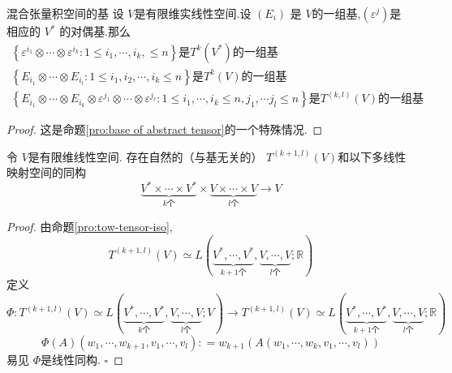 \documentclass[../../几何与拓扑.tex]{subfiles}
\begin{document}
\begin{definition}{混合张量积空间的基}
    设 $ V $是有限维实线性空间.设 $ \left( E_{i} \right)  $  是 $ V $的一组基,$ \left( \varepsilon ^{j} \right)  $是 相应的 $ V^{*} $   的对偶基.那么 $$
\begin{aligned}
    \left\{ \varepsilon^{i_1}\otimes \cdots \otimes \varepsilon^{i_{k}}: 1 \le i_1,\cdots ,i_{k},\le n \right\}\text{是} T^{k}\left( V^{*} \right)\text{的一组基} \\ 
     \left\{ E_{i_1}\otimes \cdots \otimes E_{i_{l}} : 1 \le  i_1,i_2,\cdots,i_k\le n\right\}\text{是} T^{k}\left( V \right)\text{的一组基}\\ 
      \left\{ E_{i_1}\otimes \cdots \otimes E_{i_{k}}\otimes \varepsilon^{j_1}\otimes \cdots \otimes  \varepsilon^{j_{\ell}} : 1\le i_1,\cdots ,i_{k} \le n,j_1,\cdots j_{l}\le n   \right\} \text{是} T^{\left( k,l \right) }\left( V \right) \text{的一组基}
\end{aligned} 
    $$
\end{definition}

\begin{proof}
    这是命题\ref{pro:base of abstract tensor}的一个特殊情况.
\end{proof}

\begin{proposition}
    令 \(  V  \)是有限维线性空间. 存在自然的（与基无关的） \(  T^{\left( k+ 1,l \right) }\left( V \right)   \)和以下多线性映射空间的同构 \[
    \underbrace{V^{*}\times \cdots \times V^{*}}_{k \text{个}} \times  \underbrace{V\times \cdots \times V} _{ l \text{个}} \to V
    \] 
\end{proposition}

\begin{proof}
    由命题\ref{pro:tow-tensor-iso}, \[
    T^{\left( k+ 1 ,l\right) }\left( V \right)\simeq L\left( \underbrace{V^{*}, \cdots , V^{*}}_{k+ 1\text{个}}, \underbrace{V, \cdots , V}_{l \text{个}};\mathbb{R} \right)  
    \]定义 \(  \Phi : T^{\left( k+ 1 ,l\right) }\left( V \right)\simeq L\left( \underbrace{V^{*}, \cdots , V^{*}}_{k\text{个}}, \underbrace{V, \cdots , V}_{l \text{个}};V \right) \to  T^{\left( k+ 1 ,l\right) }\left( V \right)\simeq L\left( \underbrace{V^{*}, \cdots , V^{*}}_{k+ 1\text{个}}, \underbrace{V, \cdots , V}_{l \text{个}};\mathbb{R} \right)    \)  \[
    \Phi \left( A \right)\left( w_1,\cdots ,w_{k+ 1},v_1,\cdots ,v_{l} \right): =  w_{k+ 1}\left(  A\left( w_1,\cdots ,w_{k}, v_1,\cdots,v_l  \right)  \right)   
    \]易见 \(  \Phi   \)是线性同构. 
    \hfill $\square$
\end{proof}
\end{document}
